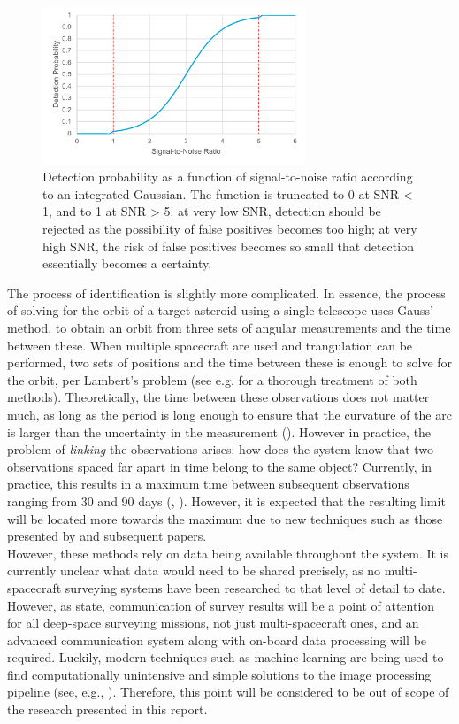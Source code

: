 \begin{figure}[htbp]
 \centering
 \includegraphics[width=0.7\textwidth]{img/snr_graph.pdf}
 \caption{Detection probability as a function of signal-to-noise ratio according to an integrated Gaussian. The function is truncated to 0 at SNR < 1, and to 1 at SNR > 5: at very low SNR, detection should be rejected as the possibility of false positives becomes too high; at very high SNR, the risk of false positives becomes so small that detection essentially becomes a certainty.}
 \label{fig:snrgraph}
\end{figure}

The process of identification is slightly more complicated. In essence, the process of solving for the orbit of a target asteroid using a single telescope uses Gauss' method, to obtain an orbit from three sets of angular measurements and the time between these. When multiple spacecraft are used and trangulation can be performed, two sets of positions and the time between these is enough to solve for the orbit, per Lambert's problem (see e.g. \cite{Curtis} for a thorough treatment of both methods). Theoretically, the time between these observations does not matter much, as long as the period is long enough to ensure that the curvature of the arc is larger than the uncertainty in the measurement (\cite{OpNav}). However in practice, the problem of \textit{linking} the observations arises: how does the system know that two observations spaced far apart in time belong to the same object? Currently, in practice, this results in a maximum time between subsequent observations ranging from 30 and 90 days (\cite{DetectionAndTracking}, \cite{2017NEOSDT}). However, it is expected that the resulting limit will be located more towards the maximum due to new techniques such as those presented by \cite{ShortArcs} and subsequent papers.\\

However, these methods rely on data being available throughout the system. It is currently unclear what data would need to be shared precisely, as no multi-spacecraft surveying systems have been researched to that level of detail to date. However, as \cite{2017NEOSDT} state, communication of survey results will be a point of attention for all deep-space surveying missions, not just multi-spacecraft ones, and an advanced communication system along with on-board data processing will be required. Luckily, modern techniques such as machine learning are being used to find computationally unintensive and simple solutions to the image processing pipeline (see, e.g., \cite{AIImage}). Therefore, this point will be considered to be out of scope of the research presented in this report. \\

